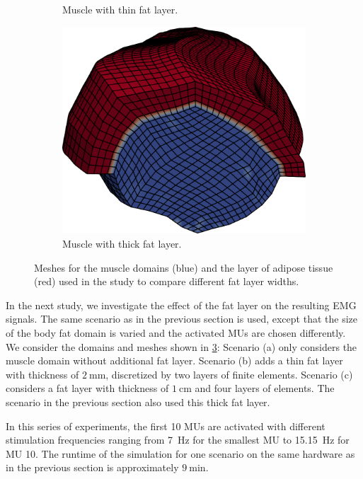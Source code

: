\begin{figure}[H]
\begin{subfigure}[t]{0.3\textwidth}
    \caption{Muscle with thin fat layer.}%
    \label{fig:fibers_emg_mesh_thin_fat}%
  \end{subfigure}  \quad
  \begin{subfigure}[t]{0.3\textwidth}%
    \centering%
    \includegraphics[width=\textwidth]{images/results/application/fibers_emg_mesh_thick_fat.png}%
    \caption{Muscle with thick fat layer.}%
    \label{fig:fibers_emg_mesh_thick_fat}%
  \end{subfigure}   
  \caption{Meshes for the muscle domains (blue) and the layer of adipose tissue (red) used in the study to compare different fat layer widths.}%
  \label{fig:fibers_emg_mesh_fat}%
\end{figure}%

In the next study, we investigate the effect of the fat layer on the resulting EMG signals. The same scenario as in the previous section is used, except that the size of the body fat domain is varied and the activated MUs are chosen differently. We consider the domains and meshes shown in \cref{fig:fibers_emg_mesh_fat}: Scenario (a) only considers the muscle domain without additional  fat layer. Scenario (b) adds a thin fat layer with thickness of $\SI{2}{\milli\meter}$, discretized by two layers of finite elements. Scenario (c) considers a fat layer with thickness of $\SI{1}{\centi\meter}$ and four layers of elements. The scenario in the previous section also used this thick fat layer.

In this series of experiments, the first 10 MUs are activated with different stimulation frequencies ranging from \SI{7}{\hertz} for the smallest MU to \SI{15.15}{\hertz} for MU 10. The runtime of the simulation for one scenario on the same hardware as in the previous section is approximately $\SI{9}{\minute}$.

